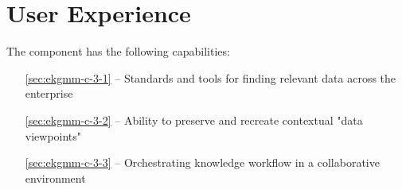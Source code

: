 \chapter{User Experience}\label{ch:ekgmm-c-3}

The  component has the following capabilities:

\begin{itemize}[leftmargin=.5in]
  \item [\ref{sec:ekgmm-c-3-1}]  -- Standards and tools for finding relevant data across the enterprise
  \item [\ref{sec:ekgmm-c-3-2}]  -- Ability to preserve and recreate contextual "data viewpoints"
  \item [\ref{sec:ekgmm-c-3-3}]  -- Orchestrating knowledge workflow in a collaborative environment
\end{itemize}





